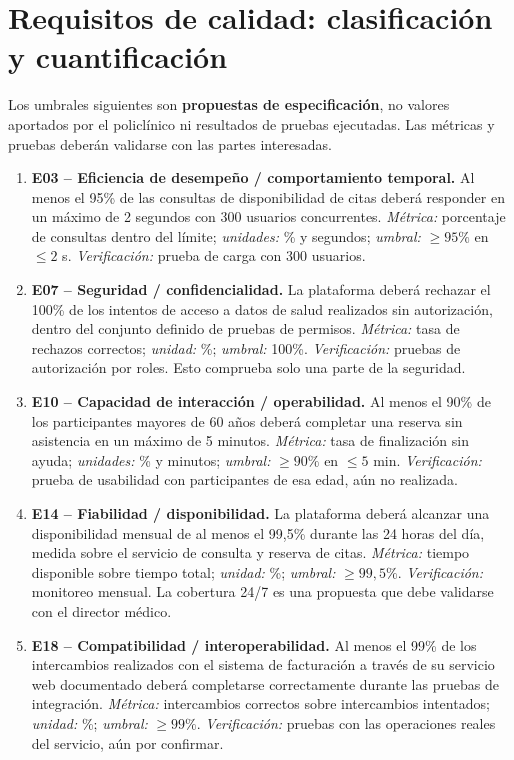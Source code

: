 \documentclass[11pt,a4paper]{article}
\begin{document}
\section{Requisitos de calidad: clasificación y cuantificación}
Los umbrales siguientes son \textbf{propuestas de especificación}, no valores aportados por el policlínico ni resultados de pruebas ejecutadas. Las métricas y pruebas deberán validarse con las partes interesadas.
\begin{enumerate}[leftmargin=*]
\item \textbf{E03 -- Eficiencia de desempeño / comportamiento temporal.} Al menos el 95\% de las consultas de disponibilidad de citas deberá responder en un máximo de 2 segundos con 300 usuarios concurrentes. \emph{Métrica:} porcentaje de consultas dentro del límite; \emph{unidades:} \% y segundos; \emph{umbral:} $\geq95\%$ en $\leq2$ s. \emph{Verificación:} prueba de carga con 300 usuarios.
\item \textbf{E07 -- Seguridad / confidencialidad.} La plataforma deberá rechazar el 100\% de los intentos de acceso a datos de salud realizados sin autorización, dentro del conjunto definido de pruebas de permisos. \emph{Métrica:} tasa de rechazos correctos; \emph{unidad:} \%; \emph{umbral:} 100\%. \emph{Verificación:} pruebas de autorización por roles. Esto comprueba solo una parte de la seguridad.
\item \textbf{E10 -- Capacidad de interacción / operabilidad.} Al menos el 90\% de los participantes mayores de 60 años deberá completar una reserva sin asistencia en un máximo de 5 minutos. \emph{Métrica:} tasa de finalización sin ayuda; \emph{unidades:} \% y minutos; \emph{umbral:} $\geq90\%$ en $\leq5$ min. \emph{Verificación:} prueba de usabilidad con participantes de esa edad, aún no realizada.
\item \textbf{E14 -- Fiabilidad / disponibilidad.} La plataforma deberá alcanzar una disponibilidad mensual de al menos el 99,5\% durante las 24 horas del día, medida sobre el servicio de consulta y reserva de citas. \emph{Métrica:} tiempo disponible sobre tiempo total; \emph{unidad:} \%; \emph{umbral:} $\geq99,5\%$. \emph{Verificación:} monitoreo mensual. La cobertura 24/7 es una propuesta que debe validarse con el director médico.
\item \textbf{E18 -- Compatibilidad / interoperabilidad.} Al menos el 99\% de los intercambios realizados con el sistema de facturación a través de su servicio web documentado deberá completarse correctamente durante las pruebas de integración. \emph{Métrica:} intercambios correctos sobre intercambios intentados; \emph{unidad:} \%; \emph{umbral:} $\geq99\%$. \emph{Verificación:} pruebas con las operaciones reales del servicio, aún por confirmar.
\end{enumerate}
\end{document}

